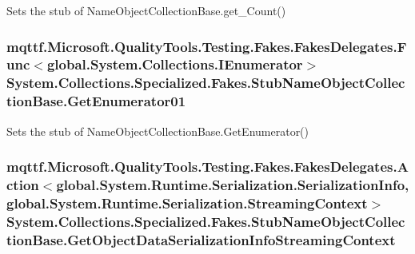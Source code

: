 Sets the stub of Name\-Object\-Collection\-Base.\-get\-\_\-\-Count()

\hypertarget{class_system_1_1_collections_1_1_specialized_1_1_fakes_1_1_stub_name_object_collection_base_afa940e9f62cbdd78634fe1c08e1a0485}{
\subsubsection[{Get\-Enumerator01}]{\setlength{\rightskip}{0pt plus 5cm}mqttf.\-Microsoft.\-Quality\-Tools.\-Testing.\-Fakes.\-Fakes\-Delegates.\-Func$<$global.\-System.\-Collections.\-I\-Enumerator$>$ System.\-Collections.\-Specialized.\-Fakes.\-Stub\-Name\-Object\-Collection\-Base.\-Get\-Enumerator01}}\label{class_system_1_1_collections_1_1_specialized_1_1_fakes_1_1_stub_name_object_collection_base_afa940e9f62cbdd78634fe1c08e1a0485}


Sets the stub of Name\-Object\-Collection\-Base.\-Get\-Enumerator()

\hypertarget{class_system_1_1_collections_1_1_specialized_1_1_fakes_1_1_stub_name_object_collection_base_a3f7621e9abba0225c5d8cf4bc5b47b55}{
\subsubsection[{Get\-Object\-Data\-Serialization\-Info\-Streaming\-Context}]{\setlength{\rightskip}{0pt plus 5cm}mqttf.\-Microsoft.\-Quality\-Tools.\-Testing.\-Fakes.\-Fakes\-Delegates.\-Action$<$global.\-System.\-Runtime.\-Serialization.\-Serialization\-Info, global.\-System.\-Runtime.\-Serialization.\-Streaming\-Context$>$ System.\-Collections.\-Specialized.\-Fakes.\-Stub\-Name\-Object\-Collection\-Base.\-Get\-Object\-Data\-Serialization\-Info\-Streaming\-Context}}\label{class_system_1_1_collections_1_1_specialized_1_1_fakes_1_1_stub_name_object_collection_base_a3f7621e9abba0225c5d8cf4bc5b47b55}


